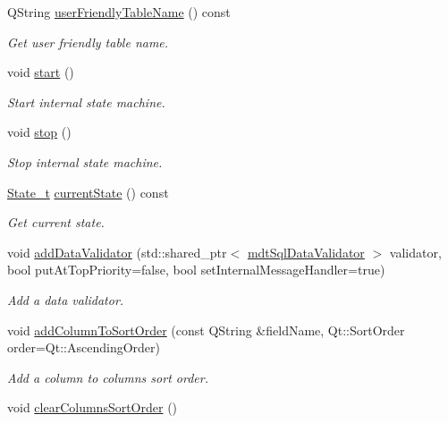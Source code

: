 \begin{DoxyCompactItemize}
Q\-String \hyperlink{classmdt_abstract_sql_table_controller_a1a9b3d3e4009acd32fc4a083f738fc62}{user\-Friendly\-Table\-Name} () const 
\begin{DoxyCompactList}\small\item\em Get user friendly table name. \end{DoxyCompactList}\item 
void \hyperlink{classmdt_abstract_sql_table_controller_a06b594e9ebed9417ab15edcddaf0f05b}{start} ()
\begin{DoxyCompactList}\small\item\em Start internal state machine. \end{DoxyCompactList}\item 
void \hyperlink{classmdt_abstract_sql_table_controller_a513308d3cce6f8042af28ee882f9d66e}{stop} ()
\begin{DoxyCompactList}\small\item\em Stop internal state machine. \end{DoxyCompactList}\item 
\hyperlink{classmdt_abstract_sql_table_controller_a63536182561f551ccb7616e1786793cd}{State\-\_\-t} \hyperlink{classmdt_abstract_sql_table_controller_adc209887a3bc01243e107614acad5514}{current\-State} () const 
\begin{DoxyCompactList}\small\item\em Get current state. \end{DoxyCompactList}\item 
void \hyperlink{classmdt_abstract_sql_table_controller_a243b633de692a4b51003726ebb292666}{add\-Data\-Validator} (std\-::shared\-\_\-ptr$<$ \hyperlink{classmdt_sql_data_validator}{mdt\-Sql\-Data\-Validator} $>$ validator, bool put\-At\-Top\-Priority=false, bool set\-Internal\-Message\-Handler=true)
\begin{DoxyCompactList}\small\item\em Add a data validator. \end{DoxyCompactList}\item 
void \hyperlink{classmdt_abstract_sql_table_controller_aa56e548973ffed3e01bd319bd7695101}{add\-Column\-To\-Sort\-Order} (const Q\-String \&field\-Name, Qt\-::\-Sort\-Order order=Qt\-::\-Ascending\-Order)
\begin{DoxyCompactList}\small\item\em Add a column to columns sort order. \end{DoxyCompactList}\item 
void \hyperlink{classmdt_abstract_sql_table_controller_a7dacbef8abf70112e2c8321722797939}{clear\-Columns\-Sort\-Order} ()

\end{DoxyCompactItemize}
